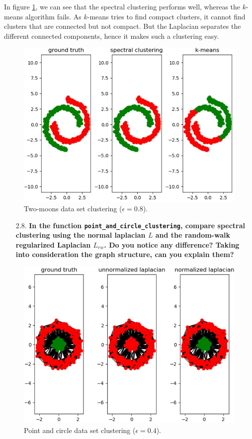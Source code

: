 \documentclass[a4paper, 11pt]{article}
\begin{document}
    In figure \ref{fig:question-27-results}, we can see that the spectral clustering performs well, whereas the $k$-means algorithm fails. As $k$-means tries to find compact clusters, it cannot find clusters that are connected but not compact. But the Laplacian separates the different connected components, hence it makes such a clustering easy.

    \begin{figure}[!ht]
        \centering
        \includegraphics[width=.5\textwidth]{images/question_27_results.jpg}
        \caption{Two-moons data set clustering ($\epsilon = 0.8$).}
        \label{fig:question-27-results}
    \end{figure}

\begin{itemize}
    \item[2.8.] \textbf{In the function \texttt{point\_and\_circle\_clustering}, compare spectral clustering using the normal laplacian $L$ and the random-walk regularized Laplacian $L_{rw}$. Do you notice any difference? Taking into consideration the graph structure, can you explain them?}
\end{itemize}

    \begin{figure}[!ht]
        \centering
        \includegraphics[width=.5\textwidth]{images/question_28_results.jpg}
        \caption{Point and circle data set clustering ($\epsilon = 0.4$).}
        \label{fig:question-28-results}
    \end{figure}
\end{document}

